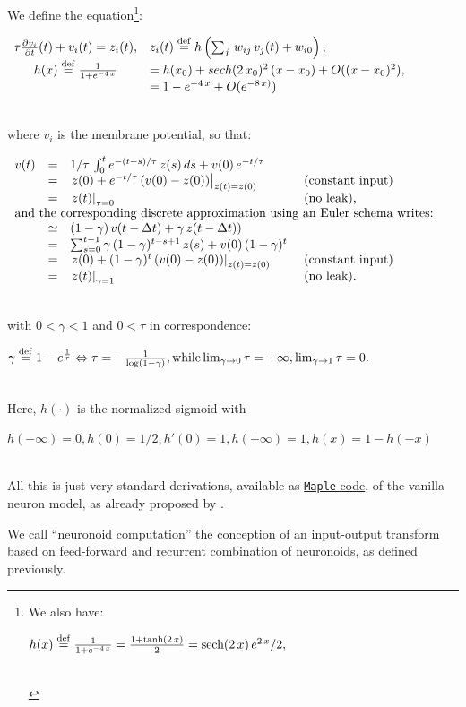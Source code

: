 \documentclass[a4]{article}
\newcommand{\eqline}[1]{~\vspace{0.1cm}\\\centerline{$#1$}\vspace{0.1cm}\\}
\newcommand{\defq}{\stackrel {\rm def}{=}}
\begin{document}
We define the equation\footnote{
We also have: \eqline{h(x) \defq \frac{1}{1+e^{-4\,x}} = \frac{1 + \tanh(2 \, x)}{2} = \mbox{sech}(2 \, x) \, e^{2 \, x} /2,}}:
\eqline{\begin{array}{cl}
  \tau \frac{\partial v_i}{\partial t}(t) + v_i(t) = z_i(t), &
  z_i(t) \defq h\left(\sum_j \, w_{ij} \, v_j(t) + w_{i0}\right), \\
  h(x) \defq \frac{1}{1+e^{-4\,x}} & = h(x_0) + sech(2 \, x_0)^2 \, (x - x_0) + O((x - x_0)^2), \\
                                                          & = 1 - e^{-4 \,x} + O(e^{-8 \, x)}) \\
\end{array}}
where $v_i$ is the membrane potential, so that:
\eqline{\begin{array}{rcll} v(t)
  &=& 1/\tau \, \int_0^t e^{-(t-s)/\tau} \, z(s) \, ds + v(0) \, e^{-t/\tau} \\
  &=& \left. z(0) + e^{-t/\tau} \, (v(0) - z(0)) \right|_{z(t)= z(0)} & \mbox{ (constant input)}\\
   &=& \left. z(t) \right|_{\tau = 0} & \mbox{ (no leak),}\\
  \multicolumn{4}{l}{\mbox{and the corresponding discrete approximation using an Euler schema writes:}} \\
  &\simeq&  (1-\gamma) \, v(t-\Delta t) + \gamma \, z(t-\Delta t)) \\
  &=& \sum_{s=0}^{t-1} \gamma \, (1-\gamma)^{t-s+1} \, z(s) + v(0) \, (1-\gamma)^t \\
  &=& \left. z(0) + (1-\gamma)^t \, (v(0) - z(0)) \right|_{z(t)= z(0)} & \mbox{ (constant input)}\\
  &=& \left. z(t) \right|_{\gamma = 1} & \mbox{ (no leak)}. \\
\end{array}}
with $0 < \gamma < 1$ and $0 < \tau$ in correspondence:
\eqline{\gamma \defq 1 - e^{\frac{1}{\tau}} \Leftrightarrow \tau = -\frac{1}{\log\left(1-\gamma\right)},  \mbox{while} \lim_{\gamma \rightarrow 0} \tau = +\infty , \lim_{\gamma \rightarrow 1} \tau = 0.}
Here,  $h(\cdot)$ is the normalized sigmoid with \eqline{h(-\infty) = 0, h(0) = 1/2, h'(0) = 1, h(+\infty) = 1, h(x) = 1 - h(-x)}
All this is just very standard derivations, available as \href{https://raw.githubusercontent.com/vthierry/braincraft/master/doc/tex/neuronoid.mpl.out.txt}{{\tt Maple} code}, of the vanilla neuron model, as already proposed by \cite{lapicque_recherches_1907}.

We call ``neuronoid computation'' the conception of an input-output transform based on feed-forward and recurrent combination of neuronoids, as defined previously.
\end{document}
